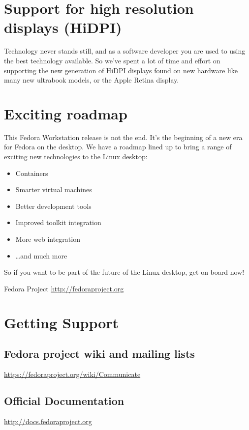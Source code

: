 \documentclass[
10pt
]{leaflet}
\begin{document}
\section{\textcolor{FedoraBlue}{Support for high resolution displays (HiDPI)}}
Technology never stands still, and as a software developer you are used to using the best technology available. So we've spent a lot of time and effort on supporting the new generation of HiDPI displays found on new hardware like many new ultrabook models, or the Apple Retina display.

\section{\textcolor{FedoraBlue}{Exciting roadmap}}
This Fedora Workstation release is not the end. It's the beginning of a new era for Fedora on the desktop. We have a roadmap lined up to bring a range of exciting new technologies to the Linux desktop:
\begin{itemize}
  \item Containers
  \item Smarter virtual machines
  \item Better development tools
  \item Improved toolkit integration
  \item More web integration
  \item \ldots and much more
\end{itemize}

So if you want to be part of the future of the Linux desktop, get on board now!
\newpage

\begin{center}
  {\color{FedoraBlue}
  \LARGE{Fedora Project\vspace{1cm}}
  \Large{\href{http://fedoraproject.org}{http://fedoraproject.org}}
}
\end{center}

\section{\textcolor{FedoraBlue}{Getting Support}}
\subsection{Fedora project wiki and mailing lists}
\href{https://fedoraproject.org/wiki/Communicate}{https://fedoraproject.org/wiki/Communicate}

\subsection{Official Documentation}
\href{http://docs.fedoraproject.org}{http://docs.fedoraproject.org}
\end{document}
